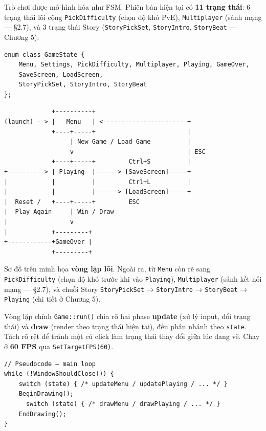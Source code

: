 \documentclass[11pt,a4paper]{article}
\begin{document}
Trò chơi được mô hình hóa như FSM. Phiên bản hiện tại có \textbf{11 trạng thái}: 6 trạng thái lõi cộng \texttt{PickDifficulty} (chọn độ khó PvE), \texttt{Multiplayer} (sảnh mạng — §2.7), và 3 trạng thái Story (\texttt{StoryPickSet}, \texttt{StoryIntro}, \texttt{StoryBeat} — Chương 5):

\begin{verbatim}
enum class GameState {
    Menu, Settings, PickDifficulty, Multiplayer, Playing, GameOver,
    SaveScreen, LoadScreen,
    StoryPickSet, StoryIntro, StoryBeat
};
\end{verbatim}

\begin{verbatim}
             +----------+
(launch) --> |   Menu   | <-----------------------+
             +----+-----+                         |
                  | New Game / Load Game          |
                  v                               | ESC
             +----+-----+         Ctrl+S          |
+----------> | Playing  |------> [SaveScreen]-----+
|            |          |         Ctrl+L          |
|            |          |------> [LoadScreen]-----+
|  Reset /   +----+-----+         ESC
|  Play Again     | Win / Draw
|                 v
|            +---------+
+------------+GameOver |
             +---------+
\end{verbatim}

Sơ đồ trên minh họa \textbf{vòng lặp lõi}. Ngoài ra, từ \texttt{Menu} còn rẽ sang \texttt{PickDifficulty} (chọn độ khó trước khi vào \texttt{Playing}), \texttt{Multiplayer} (sảnh kết nối mạng — §2.7), và chuỗi Story \texttt{StoryPickSet} → \texttt{StoryIntro} → \texttt{StoryBeat} → \texttt{Playing} (chi tiết ở Chương 5).

Vòng lặp chính \texttt{Game::run()} chia rõ hai phase \textbf{update} (xử lý input, đổi trạng thái) và \textbf{draw} (render theo trạng thái hiện tại), đều phân nhánh theo \texttt{state}. Tách rõ rệt để tránh một cú click làm trạng thái thay đổi giữa lúc đang vẽ. Chạy ở \textbf{60 FPS} qua \texttt{SetTargetFPS(60)}.

\begin{verbatim}
// Pseudocode — main loop
while (!WindowShouldClose()) {
    switch (state) { /* updateMenu / updatePlaying / ... */ }
    BeginDrawing();
      switch (state) { /* drawMenu / drawPlaying / ... */ }
    EndDrawing();
}
\end{verbatim}
\end{document}
